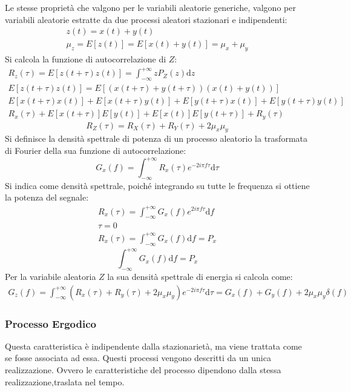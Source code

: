 \documentclass{article}
\newcommand{\df}{\mathrm{d}}
\newcommand{\intinf}{\displaystyle\int_{-\infty}^{+\infty}}
\numberwithin{equation}{subsection}
\begin{document}
Le stesse proprietà che valgono per le variabili aleatorie generiche, valgono per variabili aleatorie estratte da due processi aleatori stazionari e indipendenti:
\begin{gather*}
    z(t)=x(t)+y(t)\\
    \mu_z=E[z(t)]=E[x(t)+y(t)]=\mu_x+\mu_y
\end{gather*}
Si calcola la funzione di autocorrelazione di $Z$:
\begin{gather*}
    R_z(\tau)=E[z(t+\tau)z(t)]=\displaystyle\int_{-\infty}^{+\infty}zP_Z(z)\df z\\
    E[z(t+\tau)z(t)]=E[(x(t+\tau)+y(t+\tau))(x(t)+y(t))]\\
    E[x(t+\tau)x(t)]+E[x(t+\tau)y(t)]+E[y(t+\tau)x(t)]+E[y(t+\tau)y(t)]\\
    R_x(\tau)+E[x(t+\tau)]E[y(t)]+E[x(t)]E[y(t+\tau)]+R_y(\tau)
\end{gather*}
\begin{equation}
    R_Z(\tau)=R_X(\tau)+R_Y(\tau)+2\mu_x\mu_y
\end{equation}
Si definisce la densità spettrale di potenza di un processo aleatorio la trasformata di Fourier della sua funzione di autocorrelazione:
\begin{equation}
    G_x(f)=\intinf R_x(\tau)e^{-2i\pi f\tau}\df\tau
\end{equation}
Si indica come densità spettrale, poiché integrando su tutte le frequenza si ottiene la potenza del segnale:
\begin{gather*}
    R_x(\tau)=\intinf G_x(f)e^{2i\pi f\tau}\df f\\
    \tau=0\\
    R_x(\tau)=\intinf G_x(f)\df f=P_x
\end{gather*}
\begin{equation}
    \intinf G_x(f)\df f=P_x
\end{equation}
Per la variabile aleatoria $Z$ la sua densità spettrale di energia si calcola come:
\begin{gather}
    G_z(f)=\int_{-\infty}^{+\infty}\left(R_x(\tau)+R_y(\tau)+2\mu_x\mu_y\right)e^{-2i\pi f\tau}\df \tau=G_x(f)+G_y(f)+2\mu_x\mu_y\delta(f)
\end{gather}

\subsubsection{Processo Ergodico}

Questa caratteristica è indipendente dalla stazionarietà, ma viene trattata come se fosse associata ad essa. 
Questi processi vengono descritti da un unica realizzazione. Ovvero le caratteristiche del processo dipendono dalla stessa realizzazione,traslata nel tempo. 
\end{document}

